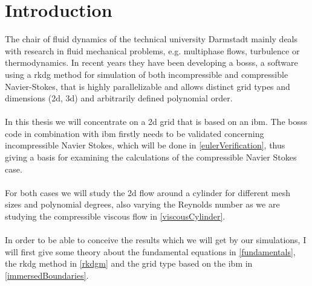 \chapter{Introduction}
The chair of fluid dynamics of the technical university Darmstadt mainly deals with research in fluid mechanical problems, e.g. multiphase flows, turbulence or thermodynamics. In recent years they have been developing a \gls{bosss}, a  software using a \gls{rkdg} method for simulation of both incompressible and compressible Navier-Stokes, that is highly parallelizable and allows distinct grid types and dimensions (\gls{2d}, \gls{3d}) and arbitrarily defined polynomial order. \\\\
In this thesis we will concentrate on a \gls{2d} grid that is based on an \gls{ibm}. The \gls{bosss} code in combination with \gls{ibm} firstly needs to be validated concerning incompressible Navier Stokes, which will be done in \ref{eulerVerification}, thus giving a basis for examining the calculations of the compressible Navier Stokes case. \\\\
For both cases we will study the \gls{2d} flow around a cylinder for different mesh sizes and polynomial degrees, also varying the Reynolds number as we are studying the compressible viscous flow in \ref{viscousCylinder}. \\\\
In order to be able to conceive the results which we will get by our simulations, I will first give some theory about the fundamental equations in \ref{fundamentals}, the \gls{rkdg} method in \ref{rkdgm} and the grid type based on the \gls{ibm} in \ref{immersedBoundaries}.
